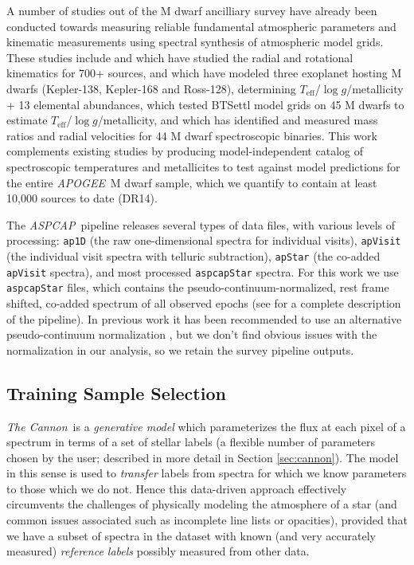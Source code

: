 \documentclass[modern]{aastex62}
\newcommand{\apogee}{\textsl{APOGEE}}
\newcommand{\thecannon}{\textsl{The Cannon}}
\newcommand{\aspcap}{\textsl{ASPCAP}}
\newcommand{\teff}{T_{\mathrm{eff}}}
\newcommand{\logg}{\log g}
\begin{document}
A number of studies out of the M dwarf ancilliary survey have already been conducted towards measuring reliable fundamental atmospheric parameters and kinematic measurements using spectral synthesis of atmospheric model grids. 
These studies include \citealt{Desphande:2013} and \citealt{Gilhool:2018} which have studied the radial and rotational kinematics for 700+ sources,
\citealt{Souto:2017} and \citealt{Souto:2018} which have modeled three exoplanet hosting M dwarfs (Kepler-138, Kepler-168 and Ross-128), determining $\teff$/$\logg$/metallicity + 13 elemental abundances,
\citealt{Rajpurohit:2018} which tested BTSettl model grids \citep{Allard:2012} on 45 M dwarfs to estimate $\teff$/$\logg$/metallicity,
and \citealt{Skinner:2018} which has identified and measured mass ratios and radial velocities for 44 M dwarf spectroscopic binaries.
This work complements existing studies by producing model-independent catalog of spectroscopic temperatures and metallicites to test against model predictions for the entire \apogee\ M dwarf sample, which we quantify to contain at least 10,000 sources to date (DR14).

The \aspcap\ pipeline releases several types of data files, with various levels of processing: {\tt\string ap1D} (the raw one-dimensional spectra for individual visits), {\tt\string apVisit} (the individual visit spectra with telluric subtraction), {\tt\string apStar} (the co-added {\tt\string apVisit} spectra), and most processed {\tt\string aspcapStar} spectra. For this work we use {\tt\string aspcapStar} files, which contains the pseudo-continuum-normalized, rest frame shifted, co-added spectrum of all observed epochs (see \citealt{Perez:2016} for a complete description of the pipeline).
In previous work it has been recommended to use an alternative pseudo-continuum normalization \citep{Ness:2015}, but we don't find obvious issues with the normalization in our analysis, so we retain the survey pipeline outputs.
 
\subsection{Training Sample Selection}

\thecannon\ is a \emph{generative model} which parameterizes the flux at each pixel of a spectrum in terms of a set of stellar labels (a flexible number of parameters chosen by the user; described in more detail in Section \ref{sec:cannon}). The model in this sense is used to \emph{transfer} labels from spectra for which we know parameters to those which we do not. Hence this data-driven approach effectively circumvents the challenges of physically modeling the atmosphere of a star (and common issues associated such as incomplete line lists or opacities), provided that we have a subset of spectra in the dataset with known (and very accurately measured) \emph{reference labels} possibly measured from other data. 
\end{document}
